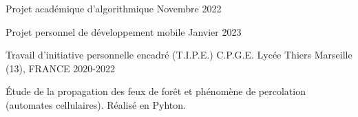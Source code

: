 \begin{cventries}
{\begin{cvitems}
        \item{}
      \end{cvitems}
    }
  \cventry
    {Projet académique d'algorithmique} %
    {} %
    {} %
    {Novembre 2022} %
    {
      \begin{cvitems} %
        \item{}
      \end{cvitems}
    }
  \cventry
    {Projet personnel de développement mobile} %
    {} %
    {} %
    {Janvier 2023} %
    {
      \begin{cvitems} %
        \item{}
      \end{cvitems}
    }
  \cventry
    {Travail d'initiative personnelle encadré (T.I.P.E.)} %
    {C.P.G.E. Lycée Thiers} %
    {Marseille (13), FRANCE} %
    {2020-2022} %
    {
      \begin{cvitems} %
        \item{Étude de la propagation des feux de forêt et phénomène de percolation (automates cellulaires). Réalisé en Pyhton.}
      \end{cvitems}
    }


\end{cventries}